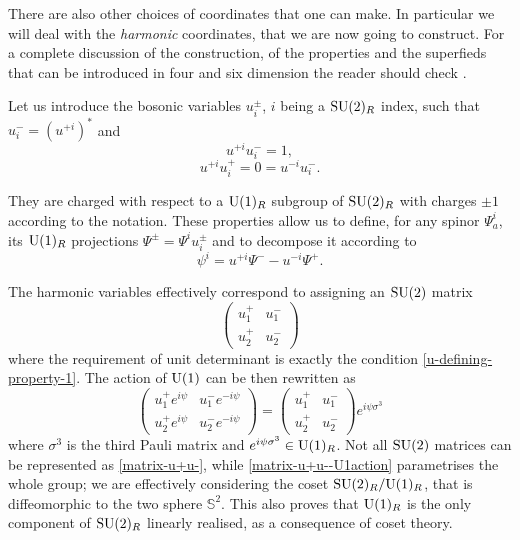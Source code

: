 There are also other choices of coordinates that one can make. In particular we will deal with the \emph{harmonic} coordinates, that we are now going to construct. For a complete discussion of the construction, of the properties and the superfieds that can be introduced in four and six dimension the reader should check \cite{Galperin:1984av, Galperin:book, Howe:1985ar}.


Let us introduce the bosonic variables $u^\pm_i$, $i$ being a ${ \text{SU} }(2)_R$ index, such that $u^-_i = (u^{+i})^*$ and
\begin{equation}\label{u-defining-property-1}
u^{+i} u^-_i = 1,
\end{equation}
\begin{equation}\label{u-defining-property-2}
u^{+i} u^+_i = 0 = u^{-i} u^-_i.
\end{equation}

They are charged with respect to a ${ \text{U} }(1)_R$ subgroup of ${ \text{SU} }(2)_R$ with charges $\pm 1$ according to the notation.
These properties allow us to define, for any spinor $\Psi^i_a$, its ${ \text{U} }(1)_R$ projections $\Psi^{\pm} = \Psi^i u^\pm_i$ and to decompose it according to
\begin{equation}
\psi^i = u^{+i} \Psi^- - u^{-i} \Psi^+.
\end{equation}

The harmonic variables effectively correspond to assigning an  \( { \text{SU} }(2) \) matrix
\begin{equation}\label{matrix-u+u-}
\begin{pmatrix}
u^+_1 	&	u^-_1	\\
u_2^+	&	u^-_2	
\end{pmatrix}
\end{equation}
where the requirement of unit determinant is exactly the condition \eqref{u-defining-property-1}.
The action of ${ \text{U} }(1)$ can be then rewritten as
\begin{equation}\label{matrix-u+u--U1action}
\begin{pmatrix}
u^+_1 e^{i\psi}	&	u^-_1 e^{- i\psi}	\\
u_2^+ e^{i\psi}	&	u^-_2 e^{- i\psi}	
\end{pmatrix}
=
\begin{pmatrix}
u^+_1 	&	u^-_1	\\
u_2^+	&	u^-_2	
\end{pmatrix}
e^{i \psi \sigma^3}
\end{equation}
where $\sigma^3$ is the third Pauli matrix and \( e^{i \psi \sigma^3} \in { \text{U} }(1)_R \). Not all ${ \text{SU} }(2)$ matrices can be represented as \eqref{matrix-u+u-}, while \eqref{matrix-u+u--U1action} parametrises the whole group; %
 we are effectively considering the coset 
 ${ \text{SU} }(2)_R / { \text{U} }(1)_R$, that is diffeomorphic to the two sphere $\mathbb{S}^2$. This also proves that ${ \text{U} }(1)_R$ is the only component of $ { \text{SU} }(2)_R $ linearly realised, as a consequence of coset theory.
 


